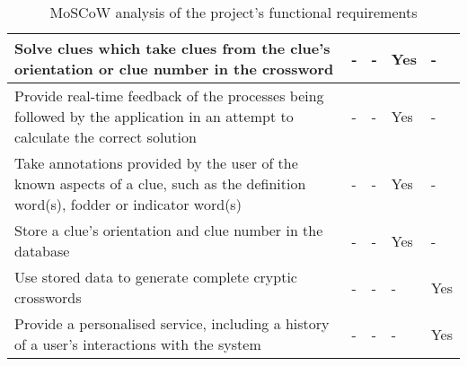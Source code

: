 \begin{table}[H]
\begin{tabular}{|p{9.3cm}|p{1.3cm}|p{1.3cm}|p{1.3cm}|p{1.3cm}|}
    Solve clues which take clues from the clue's orientation or clue number in the crossword &
    - & - & Yes & - \\ \hline

    Provide real-time feedback of the processes being followed by the application in an attempt to calculate the correct solution &
    - & - & Yes & - \\ \hline

    Take annotations provided by the user of the known aspects of a clue, such as the definition word(s), fodder or indicator word(s) &
    - & - & Yes & - \\ \hline

    Store a clue's orientation and clue number in the database &
    - & - & Yes & - \\ \hline

    Use stored data to generate complete cryptic crosswords &
    - & - & - & Yes \\ \hline

    Provide a personalised service, including a history of a user's interactions with the system &
    - & - & - & Yes \\ \hline

    \end{tabular}
    \caption {MoSCoW analysis of the project's functional requirements}
\end{table}